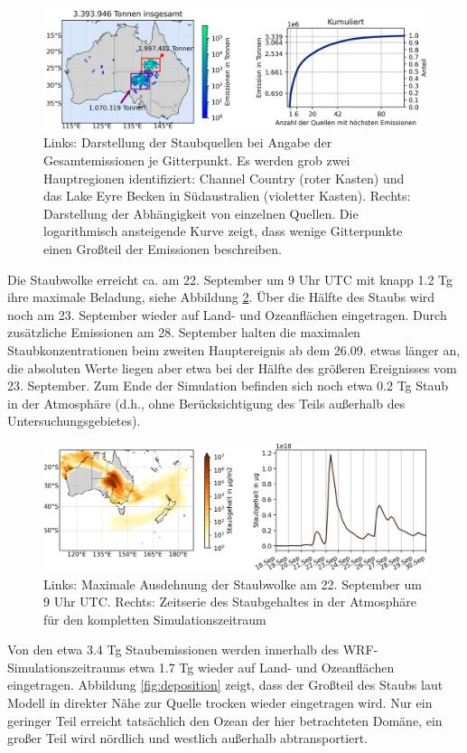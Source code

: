 \documentclass[12pt,a4paper,onecolumn]{scrartcl}
\begin{document}
\begin{figure}
\includegraphics[width=\textwidth]{bilder/emission_sections.png}
\caption{Links: Darstellung der Staubquellen bei Angabe der Gesamtemissionen je Gitterpunkt. Es werden grob zwei Hauptregionen identifiziert: Channel Country (roter Kasten) und das Lake Eyre Becken in Südaustralien (violetter Kasten). Rechts: Darstellung der Abhängigkeit von einzelnen Quellen. Die logarithmisch ansteigende Kurve zeigt, dass wenige Gitterpunkte einen Großteil der Emissionen beschreiben.} \label{fig:emissions}
\end{figure}
Die Staubwolke erreicht ca. am 22. September um 9 Uhr UTC mit knapp 1.2 Tg ihre maximale Beladung, siehe Abbildung \ref{fig:dustload_time}. Über die Hälfte des Staubs wird noch am 23. September wieder auf Land- und Ozeanflächen eingetragen. Durch zusätzliche Emissionen am 28. September halten die maximalen Staubkonzentrationen beim zweiten Hauptereignis ab dem 26.09. etwas länger an, die absoluten Werte liegen aber etwa bei der Hälfte des größeren Ereignisses vom 23. September. Zum Ende der Simulation befinden sich noch etwa 0.2 Tg Staub in der Atmosphäre (d.h., ohne Berücksichtigung des Teils außerhalb des Untersuchungsgebietes).
\begin{figure}
\includegraphics[width=\textwidth]{bilder/dustload_time.png}
\caption{Links: Maximale Ausdehnung der Staubwolke am 22. September um 9 Uhr UTC. Rechts: Zeitserie des Staubgehaltes in der Atmosphäre für den kompletten Simulationszeitraum} \label{fig:dustload_time}
\end{figure}
Von den etwa 3.4 Tg Staubemissionen werden innerhalb des WRF-Simulationszeitraums etwa 1.7 Tg wieder auf Land- und Ozeanflächen eingetragen. Abbildung \ref{fig:deposition} zeigt, dass der Großteil des Staubs laut Modell in direkter Nähe zur Quelle trocken wieder eingetragen wird. Nur ein geringer Teil erreicht tatsächlich den Ozean der hier betrachteten Domäne, ein großer Teil wird nördlich und westlich außerhalb abtransportiert. 
\end{document}
